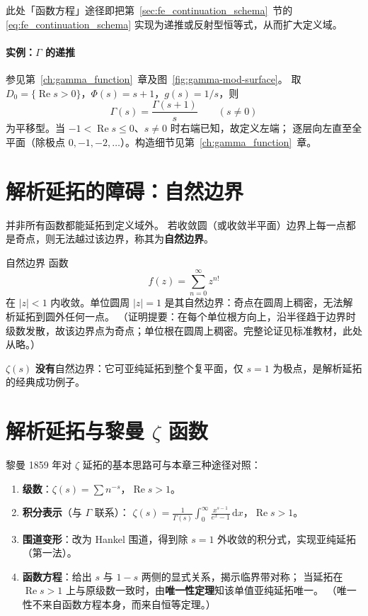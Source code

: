 此处「函数方程」途径即把第~\ref{sec:fe_continuation_schema}~节的
\eqref{eq:fe_continuation_schema} 实现为递推或反射型恒等式，从而扩大定义域。

\paragraph{实例：$\Gamma$ 的递推}
参见第~\ref{ch:gamma_function}~章及图~\ref{fig:gamma-mod-surface}。
取 $D_0=\{\operatorname{Re}s>0\}$，$\Phi(s)=s+1$，$g(s)=1/s$，则
\[
  \Gamma(s) = \frac{\Gamma(s+1)}{s}\qquad (s\neq 0)
\]
为平移型。当 $-1<\operatorname{Re}s\le 0$、$s\neq 0$ 时右端已知，故定义左端；
逐层向左直至全平面（除极点 $0,-1,-2,\ldots$）。构造细节见第~\ref{ch:gamma_function}~章。


\section{解析延拓的障碍：自然边界}\label{sec:natural_boundary}

并非所有函数都能延拓到定义域外。
若收敛圆（或收敛半平面）边界上每一点都是奇点，则无法越过该边界，称其为\textbf{自然边界}。

\begin{example}{自然边界}{}
函数
\[
f(z)=\sum_{n=0}^{\infty} z^{n!}
\]
在 $|z|<1$ 内收敛。单位圆周 $|z|=1$ 是其自然边界：奇点在圆周上稠密，无法解析延拓到圆外任何一点。
（证明提要：在每个单位根方向上，沿半径趋于边界时级数发散，故该边界点为奇点；单位根在圆周上稠密。完整论证见标准教材，此处从略。）
\end{example}

$\zeta(s)$ \textbf{没有}自然边界：它可亚纯延拓到整个复平面，仅 $s=1$ 为极点，是解析延拓的经典成功例子。


\section{解析延拓与黎曼 \texorpdfstring{$\zeta$}{Zeta} 函数}\label{sec:continuation_and_zeta}

黎曼 1859 年对 $\zeta$ 延拓的基本思路可与本章三种途径对照：

\begin{enumerate}
  \item \textbf{级数}：$\zeta(s)=\sum n^{-s}$，$\operatorname{Re}s>1$。
  \item \textbf{积分表示}（与 $\Gamma$ 联系）：
    $\zeta(s)=\frac{1}{\Gamma(s)}\int_0^{\infty}\frac{x^{s-1}}{e^x-1}\,\mathrm{d}x$，$\operatorname{Re}s>1$。
  \item \textbf{围道变形}：改为 Hankel 围道，得到除 $s=1$ 外收敛的积分式，实现亚纯延拓（第一法）。
  \item \textbf{函数方程}：给出 $s$ 与 $1-s$ 两侧的显式关系，揭示临界带对称；
    当延拓在 $\operatorname{Re}s>1$ 上与原级数一致时，由\textbf{唯一性定理}知该单值亚纯延拓唯一。
    （唯一性不来自函数方程本身，而来自恒等定理。）
\end{enumerate}

